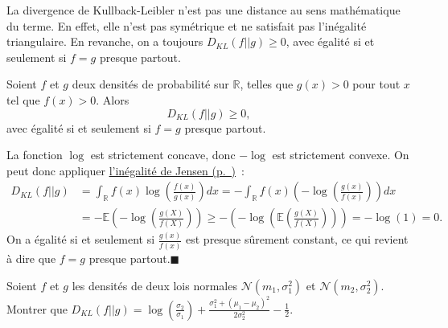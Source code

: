 \begin{remarque}\label{II-remarque-1}
La divergence de Kullback-Leibler n'est pas une distance au sens
mathématique du terme. En effet, elle n'est pas symétrique et ne
satisfait pas l'inégalité triangulaire. En revanche, on a toujours
\(D_{KL}(f||g) \geq 0\), avec égalité si et seulement si \(f = g\)
presque partout.
\end{remarque}

\begin{proposition}\label{II-corKL}

Soient \(f\) et \(g\) deux densités de probabilité sur \(\mathbb{R}\),
telles que \(g(x) > 0\) pour tout \(x\) tel que \(f(x) > 0\). Alors
\[ D_{KL}(f||g) \geq 0,\] avec égalité si et seulement si \(f = g\)
presque partout.
\end{proposition}

\begin{preuve}
La fonction \(\log\) est strictement concave, donc \(-\log\) est
strictement convexe. On peut donc appliquer
\protect\hyperref[II-jensen]{l'inégalité de
Jensen (p.~\pageref*{II-jensen})}~: \begin{align*}
D_{KL}(f||g) & = \int_\mathbb{R}f(x) \log\left(\frac{f(x)}{g(x)}\right) dx = - \int_\mathbb{R}f(x) \left(-\log\left(\frac{g(x)}{f(x)}\right)\right) dx \\
& = - \mathbb{E}\left(-\log\left(\frac{g(X)}{f(X)}\right)\right) \geq - \left(-\log\left(\mathbb{E}\left(\frac{g(X)}{f(X)}\right)\right)\right) = -\log(1) = 0.
\end{align*} On a égalité si et seulement si \(\frac{g(x)}{f(x)}\) est
presque sûrement constant, ce qui revient à dire que \(f = g\) presque
partout.\hfill$\blacksquare$
\end{preuve}

\label{II-exoklgauss}
Soient \(f\) et \(g\) les densités de deux lois normales
\(\mathcal{N}(m_1,\sigma_1^2)\) et \(\mathcal{N}(m_2,\sigma_2^2)\).
Montrer que
\(D_{KL}(f||g) = \log \left(\frac{\sigma_2}{\sigma_1}\right) + \frac{\sigma_1^2 + (\mu_1 - \mu_2)^2}{2\sigma_2^2} - \frac{1}{2}\).

